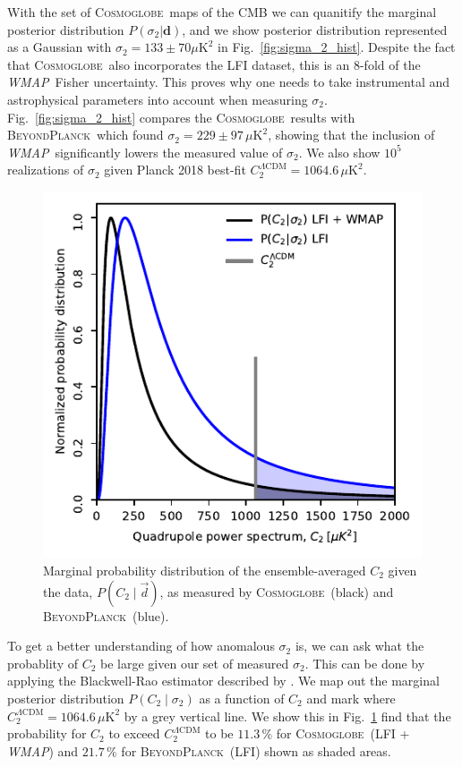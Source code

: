 \documentclass[twocolumn]{../../common/aa}
\def\WMAP{\emph{WMAP}}
\newcommand{\BP}{\textsc{BeyondPlanck}}
\newcommand{\bp}{\textsc{BeyondPlanck}}
\newcommand{\cosmoglobe}{\textsc{Cosmoglobe}}
\newcommand{\Cosmoglobe}{\textsc{Cosmoglobe}}
\newcommand{\data}{\vec d}
\begin{document}
With the set of \cosmoglobe\ maps of the CMB we can quanitify the marginal posterior distribution $P(\sigma_2 | \mathbf{d})$, and we show posterior distribution represented as a Gaussian with $\sigma_2 = 133 \pm 70 \mu \mathrm{K}^2$ in Fig.~\ref{fig:sigma_2_hist}. Despite the fact that \Cosmoglobe\ also incorporates the LFI dataset, this is an 8-fold of the \WMAP\ Fisher uncertainty. This proves why one needs to take instrumental and astrophysical parameters into account when measuring $\sigma_2$. Fig.~\ref{fig:sigma_2_hist} compares the \cosmoglobe\ results with \bp\ which found $\sigma_2 = 229\pm 97\,\mu\mathrm{K}^2$, showing that the inclusion of \WMAP\ significantly lowers the measured value of $\sigma_2$. We also show $10^5$ realizations of $\sigma_2$ given Planck 2018 best-fit $C^{\Lambda \mathrm{CDM}}_2 = 1064.6\, \mu\mathrm{K}^2$.


\begin{figure}
	\includegraphics[width=\columnwidth]{figures/WMAP_blackwell-rao.pdf}
	\caption{Marginal probability distribution of the ensemble-averaged $C_2$ given the data, $P(C_2\mid\data)$, as measured by \Cosmoglobe\ (black) and \BP\ (blue).}
	\label{fig:blackwell_rao_sigma_2}
\end{figure}


To get a better understanding of how anomalous $\sigma_2$ is, we can ask what the probablity of $C_2$ be large given our set of measured $\sigma_2$. This can be done by applying the Blackwell-Rao estimator described by \citet{chu2005}. We map out the marginal posterior distribution $P(C_2 \mid\sigma_2)$ as a function of $C_2$ and mark where $C^{\Lambda \mathrm{CDM}}_2 = 1064.6\, \mu\mathrm{K}^2$ by a grey vertical line. We show this in Fig.~\ref{fig:blackwell_rao_sigma_2} find that the probability for $C_2$ to exceed $C^{\Lambda \mathrm{CDM}}_2$ to be $11.3\,\%$ for \cosmoglobe\ (LFI + \WMAP) and $21.7\,\%$ for \bp\ (LFI) shown as shaded areas.
\end{document}
